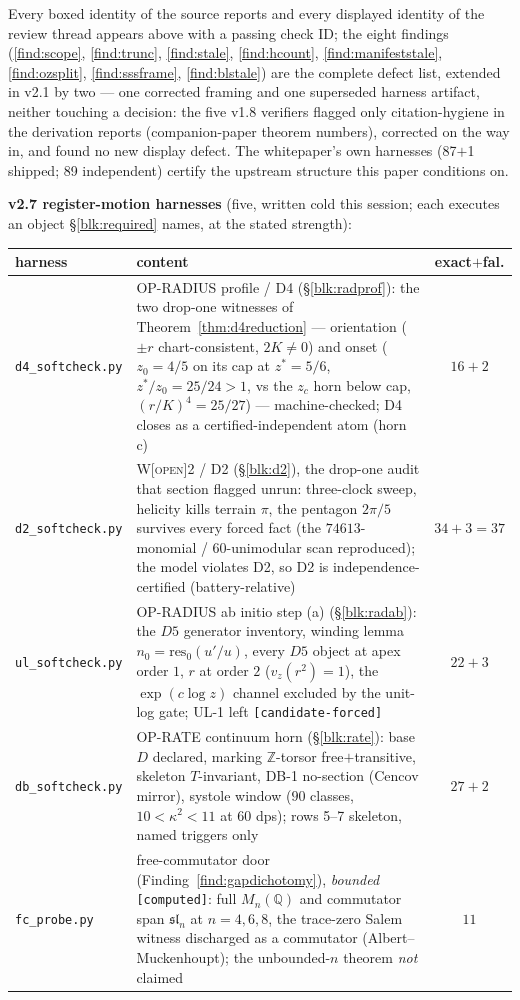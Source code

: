 \documentclass[11pt]{article}
\newcommand{\tagO}{\textcolor{cO}{\textsc{[open]}}}
\newcommand{\Q}{\mathbb{Q}}
\newcommand{\Z}{\mathbb{Z}}
\theoremstyle{plain}
\theoremstyle{definition}
\theoremstyle{remark}
\begin{document}
\smallskip\noindent
Every boxed identity of the source reports and every displayed identity of the
review thread appears above with a passing check ID; the eight findings
(\ref{find:scope}, \ref{find:trunc}, \ref{find:stale}, \ref{find:hcount},
\ref{find:manifeststale}, \ref{find:ozsplit}, \ref{find:sssframe},
\ref{find:blstale})
are the complete defect list, extended in v2.1 by two --- one corrected framing
and one superseded harness artifact, neither touching a decision: the five v1.8 verifiers
flagged only citation-hygiene in the derivation reports (companion-paper
theorem numbers), corrected on the way in, and found no new display defect. The
whitepaper's own harnesses (87$+$1 shipped; 89 independent) certify the upstream
structure this paper conditions on.

\smallskip\noindent
\textbf{v2.7 register-motion harnesses} (five, written cold this session; each
executes an object \S\ref{blk:required} names, at the stated strength):
\begin{center}\footnotesize\setlength{\tabcolsep}{4pt}
\begin{tabular}{@{}lp{10.2cm}c@{}}
\toprule
harness & content & exact$+$fal.\\
\midrule
\texttt{d4\_softcheck.py} & OP-RADIUS profile / D4 (\S\ref{blk:radprof}): the two drop-one witnesses of Theorem~\ref{thm:d4reduction} --- orientation ($\pm r$ chart-consistent, $2K\ne0$) and onset ($z_0{=}4/5$ on its cap at $z^\ast{=}5/6$, $z^\ast/z_0{=}25/24{>}1$, vs the $z_c$ horn below cap, $(r/K)^4{=}25/27$) --- machine-checked; D4 closes as a certified-independent atom (horn c) & $16{+}2$\\
\texttt{d2\_softcheck.py} & W\tagO{}2 / D2 (\S\ref{blk:d2}), the drop-one audit that section flagged unrun: three-clock sweep, helicity kills terrain $\pi$, the pentagon $2\pi/5$ survives every forced fact (the $74613$-monomial / $60$-unimodular scan reproduced); the model violates D2, so D2 is independence-certified (battery-relative) & $34{+}3{=}37$\\
\texttt{ul\_softcheck.py} & OP-RADIUS ab initio step (a) (\S\ref{blk:radab}): the $D5$ generator inventory, winding lemma $n_0{=}\mathrm{res}_0(u'/u)$, every $D5$ object at apex order $1$, $r$ at order $2$ ($v_z(r^2){=}1$), the $\exp(c\log z)$ channel excluded by the unit-log gate; \textsc{UL-1} left \texttt{[candidate-forced]} & $22{+}3$\\
\texttt{db\_softcheck.py} & OP-RATE continuum horn (\S\ref{blk:rate}): base $D$ declared, marking $\Z$-torsor free$+$transitive, skeleton $T$-invariant, \textsc{DB-1} no-section (Cencov mirror), systole window ($90$ classes, $10{<}\kappa^2{<}11$ at 60 dps); rows 5--7 skeleton, named triggers only & $27{+}2$\\
\texttt{fc\_probe.py} & free-commutator door (Finding~\ref{find:gapdichotomy}), \emph{bounded} \texttt{[computed]}: full $M_n(\Q)$ and commutator span $\mathfrak{sl}_n$ at $n{=}4,6,8$, the trace-zero Salem witness discharged as a commutator (Albert--Muckenhoupt); the unbounded-$n$ theorem \emph{not} claimed & $11$\\
\bottomrule
\end{tabular}
\end{center}
\end{document}
